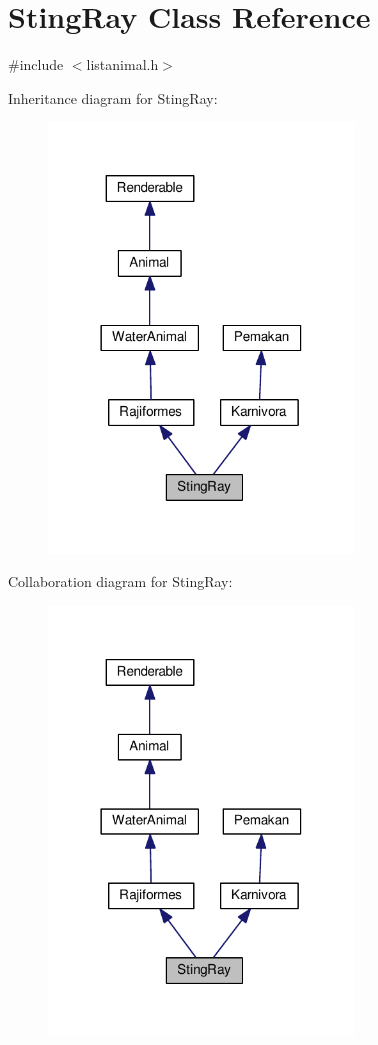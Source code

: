 \hypertarget{classStingRay}{}\section{Sting\+Ray Class Reference}
\label{classStingRay}


{\ttfamily \#include $<$listanimal.\+h$>$}



Inheritance diagram for Sting\+Ray\+:
\nopagebreak
\begin{figure}[H]
\begin{center}
\leavevmode
\includegraphics[width=230pt]{classStingRay__inherit__graph}
\end{center}
\end{figure}


Collaboration diagram for Sting\+Ray\+:
\nopagebreak
\begin{figure}[H]
\begin{center}
\leavevmode
\includegraphics[width=230pt]{classStingRay__coll__graph}
\end{center}
\end{figure}
